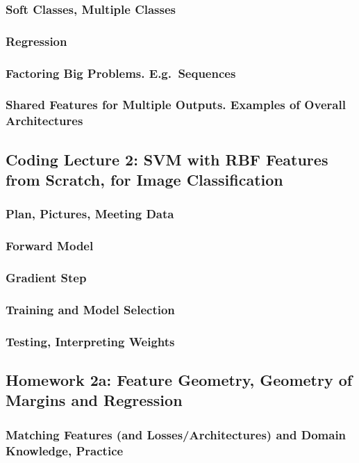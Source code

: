 \documentclass[12pt]{article}
\begin{document}
      \subsubsection*{Soft Classes, Multiple Classes}
      \subsubsection*{Regression}
      \subsubsection*{Factoring Big Problems.  E.g.\ Sequences}
      \subsubsection*{Shared Features for Multiple Outputs.  Examples of Overall Architectures}
    \newpage

    \subsection*{Coding Lecture 2: SVM with RBF Features from Scratch, for Image Classification}
      \subsubsection*{Plan, Pictures, Meeting Data}
      \subsubsection*{Forward Model}
      \subsubsection*{Gradient Step}
      \subsubsection*{Training and Model Selection}
      \subsubsection*{Testing, Interpreting Weights}
    \newpage

    \subsection*{Homework 2a: Feature Geometry, Geometry of Margins and Regression}
      \subsubsection*{Matching Features (and Losses/Architectures) and Domain Knowledge, Practice}
\end{document}
